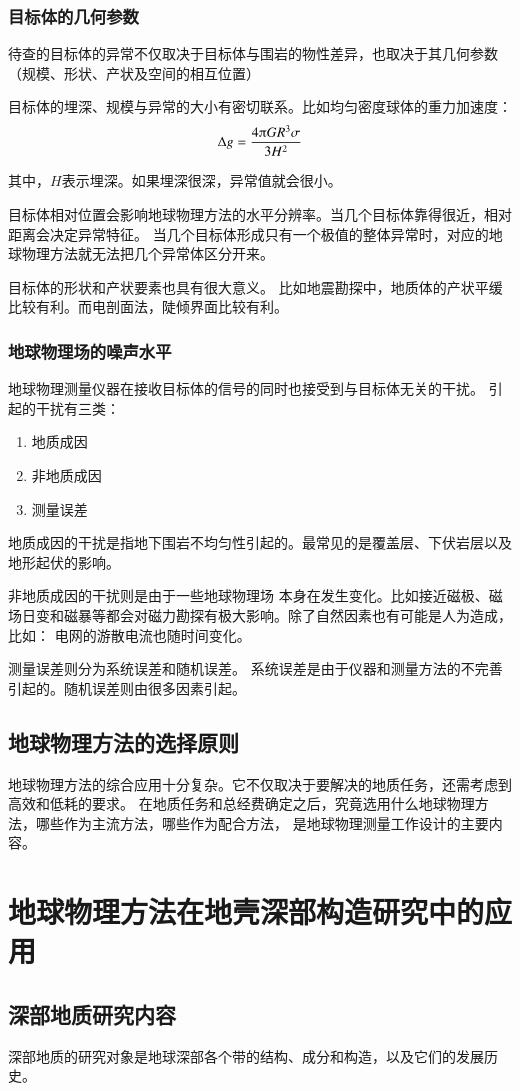 \documentclass[hyperref,UTF-8]{ctexart}
\begin{document}
\subsubsection{目标体的几何参数}
待查的目标体的异常不仅取决于目标体与围岩的物性差异，也取决于其几何参数（规模、形状、产状及空间的相互位置）

目标体的埋深、规模与异常的大小有密切联系。比如均匀密度球体的重力加速度：
$$\Delta g=\frac{4{\piup}GR^3\sigma}{3H^2}$$

其中，$H$表示埋深。如果埋深很深，异常值就会很小。

目标体相对位置会影响地球物理方法的水平分辨率。当几个目标体靠得很近，相对距离会决定异常特征。
当几个目标体形成只有一个极值的整体异常时，对应的地球物理方法就无法把几个异常体区分开来。

目标体的形状和产状要素也具有很大意义。
比如地震勘探中，地质体的产状平缓比较有利。而电剖面法，陡倾界面比较有利。
\subsubsection{地球物理场的噪声水平}
地球物理测量仪器在接收目标体的信号的同时也接受到与目标体无关的干扰。
引起的干扰有三类：
\begin{enumerate}
\item 地质成因
\item 非地质成因
\item 测量误差
\end{enumerate}
地质成因的干扰是指地下围岩不均匀性引起的。最常见的是覆盖层、下伏岩层以及地形起伏的影响。

非地质成因的干扰则是由于一些地球物理场
本身在发生变化。比如接近磁极、磁场日变和磁暴等都会对磁力勘探有极大影响。除了自然因素也有可能是人为造成，比如：
电网的游散电流也随时间变化。

测量误差则分为系统误差和随机误差。
系统误差是由于仪器和测量方法的不完善引起的。随机误差则由很多因素引起。
\subsection{地球物理方法的选择原则}
地球物理方法的综合应用十分复杂。它不仅取决于要解决的地质任务，还需考虑到高效和低耗的要求。
在地质任务和总经费确定之后，究竟选用什么地球物理方法，哪些作为主流方法，哪些作为配合方法，
是地球物理测量工作设计的主要内容。
\section{地球物理方法在地壳深部构造研究中的应用}
\subsection{深部地质研究内容}
深部地质的研究对象是地球深部各个带的结构、成分和构造，以及它们的发展历史。
\end{document}
